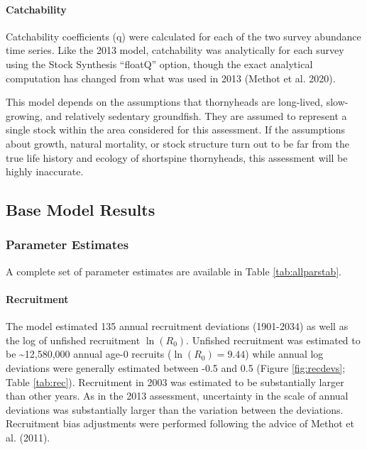 \documentclass[11pt,
  letterpaper,
]{article}
\begin{document}
\hypertarget{catchability}{%
\paragraph{Catchability}\label{catchability}}

Catchability coefficients (q) were calculated for each of the two survey abundance time series. Like the 2013 model, catchability was analytically for each survey using the Stock Synthesis ``floatQ'' option, though the exact analytical computation has changed from what was used in 2013 (Methot et al. 2020).

This model depends on the assumptions that thornyheads are long-lived, slow-growing, and relatively sedentary groundfish. They are assumed to represent a single stock within the area considered for this assessment. If the assumptions about growth, natural mortality, or stock structure turn out to be far from the true life history and ecology of shortspine thornyheads, this assessment will be highly inaccurate.

\hypertarget{base-model-results}{%
\subsection{Base Model Results}\label{base-model-results}}

\hypertarget{parameter-estimates}{%
\subsubsection{Parameter Estimates}\label{parameter-estimates}}

A complete set of parameter estimates are available in Table \ref{tab:allparstab}.

\hypertarget{recruitment-1}{%
\paragraph{Recruitment}\label{recruitment-1}}

The model estimated 135 annual recruitment deviations (1901-2034) as well as the log of unfished recruitment \(\ln(R_0)\). Unfished recruitment was estimated to be \textasciitilde12,580,000 annual age-0 recruits (\(\ln(R_0) = 9.44\)) while annual log deviations were generally estimated between -0.5 and 0.5 (Figure \ref{fig:recdevs}; Table \ref{tab:rec}). Recruitment in 2003 was estimated to be substantially larger than other years. As in the 2013 assessment, uncertainty in the scale of annual deviations was substantially larger than the variation between the deviations. Recruitment bias adjustments were performed following the advice of Methot et al. (2011).
\end{document}
